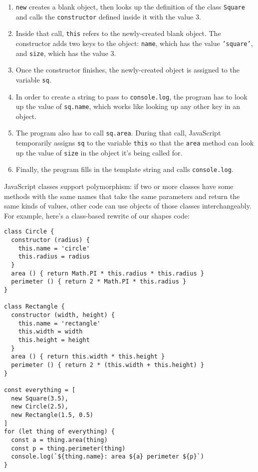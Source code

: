 \begin{enumerate}
\item
  \texttt{new} creates a blank object,
  then looks up the definition of the class \texttt{Square}
  and calls the \texttt{constructor} defined inside it
  with the value 3.
\item
  Inside that call,
  \texttt{this} refers to the newly-created blank object.
  The constructor adds two keys to the object:
  \texttt{name}, which has the value \texttt{'square'},
  and \texttt{size}, which has the value 3.
\item
  Once the constructor finishes,
  the newly-created object is assigned to the variable \texttt{sq}.
\item
  In order to create a string to pass to \texttt{console.log},
  the program has to look up the value of \texttt{sq.name},
  which works like looking up any other key in an object.
\item
  The program also has to call \texttt{sq.area}.
  During that call,
  JavaScript temporarily assigns \texttt{sq} to the variable \texttt{this}
  so that the \texttt{area} method can look up the value of \texttt{size}
  in the object it's being called for.
\item
  Finally,
  the program fills in the template string and calls \texttt{console.log}.
\end{enumerate}

JavaScript classes support polymorphism:
if two or more classes have some methods with the same names
that take the same parameters
and return the same kinds of values,
other code can use objects of those classes interchangeably.
For example,
here's a class-based rewrite of our shapes code:

\begin{verbatim}
class Circle {
  constructor (radius) {
    this.name = 'circle'
    this.radius = radius
  }
  area () { return Math.PI * this.radius * this.radius }
  perimeter () { return 2 * Math.PI * this.radius }
}

class Rectangle {
  constructor (width, height) {
    this.name = 'rectangle'
    this.width = width
    this.height = height
  }
  area () { return this.width * this.height }
  perimeter () { return 2 * (this.width + this.height) }
}

const everything = [
  new Square(3.5),
  new Circle(2.5),
  new Rectangle(1.5, 0.5)
]
for (let thing of everything) {
  const a = thing.area(thing)
  const p = thing.perimeter(thing)
  console.log(`${thing.name}: area ${a} perimeter ${p}`)
}
\end{verbatim}


